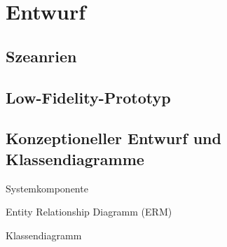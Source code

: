 \section{Entwurf}

\subsection{Szeanrien}
\subsection{Low-Fidelity-Prototyp}
\subsection{Konzeptioneller Entwurf und Klassendiagramme}

Systemkomponente

Entity Relationship Diagramm (ERM)


Klassendiagramm